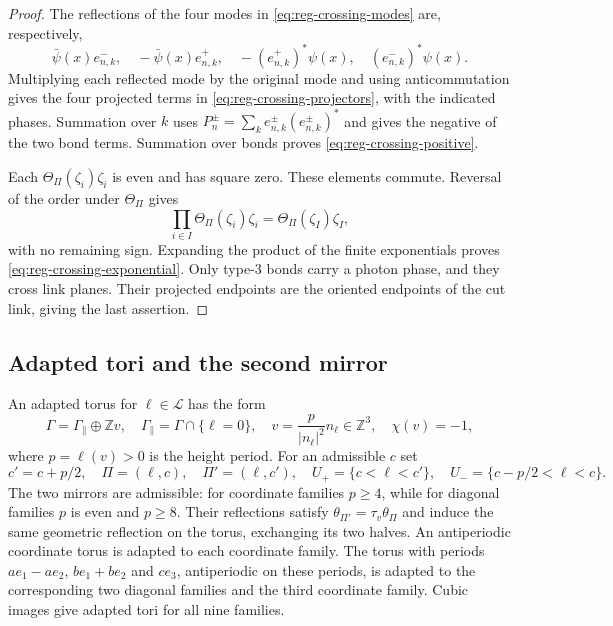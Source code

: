 \documentclass[11pt,letterpaper,reqno]{amsart}
\newcommand{\Z}{\mathbb Z}
\begin{document}
\begin{proof}
The reflections of the four modes in \eqref{eq:reg-crossing-modes}
are, respectively,
\[
 \bar\psi(x)e_{n,k}^-,\quad-\bar\psi(x)e_{n,k}^+,
 \quad-(e_{n,k}^+)^*\psi(x),\quad(e_{n,k}^-)^*\psi(x).
\]
Multiplying each reflected mode by the original mode and using
anticommutation gives the four projected terms in
\eqref{eq:reg-crossing-projectors}, with the indicated phases.
Summation over $k$ uses
$P_n^\pm=\sum_ke_{n,k}^\pm(e_{n,k}^\pm)^*$ and gives the negative of
the two bond terms. Summation over bonds proves
\eqref{eq:reg-crossing-positive}.

Each $\Theta_\Pi(\zeta_i)\zeta_i$ is even and has square zero.
These elements commute. Reversal of the order under $\Theta_\Pi$
gives
\[
 \prod_{i\in I}\Theta_\Pi(\zeta_i)\zeta_i
 =\Theta_\Pi(\zeta_I)\zeta_I,
\]
with no remaining sign. Expanding the product of the finite
exponentials proves \eqref{eq:reg-crossing-exponential}.
Only type-$3$ bonds carry a photon phase, and they cross link
planes. Their projected endpoints are the oriented endpoints of
the cut link, giving the last assertion.
\end{proof}

\subsection{Adapted tori and the second mirror}\label{subsec:reg-adapted}

An adapted torus for $\ell\in\mathcal L$ has the form
\begin{equation}\label{eq:reg-adapted-torus}
 \Gamma=\Gamma_\parallel\oplus\Z v,
 \quad \Gamma_\parallel=\Gamma\cap\{\ell=0\},
 \quad v=\frac{p}{|n_\ell|^2}n_\ell\in\Z^3,
 \quad \chi(v)=-1,
\end{equation}
where $p=\ell(v)>0$ is the height period. For an admissible $c$ set
\[
 c'=c+p/2,\quad \Pi=(\ell,c),\quad\Pi'=(\ell,c'),\quad
 U_+=\{c<\ell<c'\},\quad U_-=\{c-p/2<\ell<c\}.
\]
The two mirrors are admissible: for coordinate families $p\ge4$,
while for diagonal families $p$ is even and $p\ge8$. Their
reflections satisfy $\theta_{\Pi'}=\tau_v\theta_\Pi$ and induce the
same geometric reflection on the torus, exchanging its two halves.
An antiperiodic coordinate torus is adapted to each coordinate
family. The torus with periods $ae_1-ae_2$, $be_1+be_2$ and $ce_3$,
antiperiodic on these periods, is adapted to the corresponding two
diagonal families and the third coordinate family. Cubic images
give adapted tori for all nine families.
\end{document}
